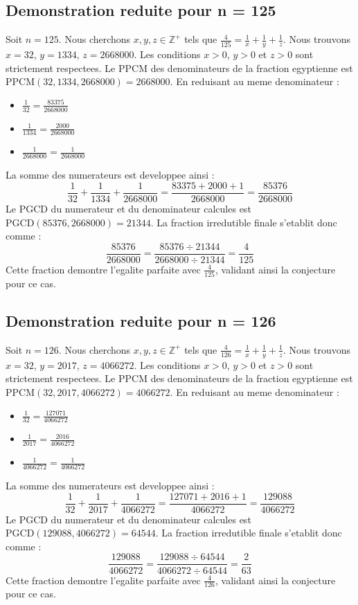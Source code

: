 \documentclass[11pt,a4paper]{article}
\begin{document}
\subsection{Demonstration reduite pour n = 125}
Soit $n = 125$. Nous cherchons $x, y, z \in \mathbb{Z}^{+}$ tels que $\frac{4}{125} = \frac{1}{x} + \frac{1}{y} + \frac{1}{z}$.
Nous trouvons $x = 32$, $y = 1334$, $z = 2668000$.
Les conditions $x > 0$, $y > 0$ et $z > 0$ sont strictement respectees.
Le PPCM des denominateurs de la fraction egyptienne est $\text{PPCM}(32, 1334, 2668000) = 2668000$.
En reduisant au meme denominateur :
\begin{itemize}
    \item $\frac{1}{32} = \frac{83375}{2668000}$
    \item $\frac{1}{1334} = \frac{2000}{2668000}$
    \item $\frac{1}{2668000} = \frac{1}{2668000}$
\end{itemize}
La somme des numerateurs est developpee ainsi :
$$ \frac{1}{32} + \frac{1}{1334} + \frac{1}{2668000} = \frac{83375 + 2000 + 1}{2668000} = \frac{85376}{2668000} $$
Le PGCD du numerateur et du denominateur calcules est $\text{PGCD}(85376, 2668000) = 21344$.
La fraction irredutible finale s'etablit donc comme :
$$ \frac{85376}{2668000} = \frac{85376 \div 21344}{2668000 \div 21344} = \frac{4}{125} $$
Cette fraction demontre l'egalite parfaite avec $\frac{4}{125}$, validant ainsi la conjecture pour ce cas.

\subsection{Demonstration reduite pour n = 126}
Soit $n = 126$. Nous cherchons $x, y, z \in \mathbb{Z}^{+}$ tels que $\frac{4}{126} = \frac{1}{x} + \frac{1}{y} + \frac{1}{z}$.
Nous trouvons $x = 32$, $y = 2017$, $z = 4066272$.
Les conditions $x > 0$, $y > 0$ et $z > 0$ sont strictement respectees.
Le PPCM des denominateurs de la fraction egyptienne est $\text{PPCM}(32, 2017, 4066272) = 4066272$.
En reduisant au meme denominateur :
\begin{itemize}
    \item $\frac{1}{32} = \frac{127071}{4066272}$
    \item $\frac{1}{2017} = \frac{2016}{4066272}$
    \item $\frac{1}{4066272} = \frac{1}{4066272}$
\end{itemize}
La somme des numerateurs est developpee ainsi :
$$ \frac{1}{32} + \frac{1}{2017} + \frac{1}{4066272} = \frac{127071 + 2016 + 1}{4066272} = \frac{129088}{4066272} $$
Le PGCD du numerateur et du denominateur calcules est $\text{PGCD}(129088, 4066272) = 64544$.
La fraction irredutible finale s'etablit donc comme :
$$ \frac{129088}{4066272} = \frac{129088 \div 64544}{4066272 \div 64544} = \frac{2}{63} $$
Cette fraction demontre l'egalite parfaite avec $\frac{4}{126}$, validant ainsi la conjecture pour ce cas.
\end{document}
